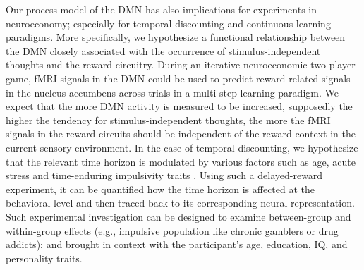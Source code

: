 \documentclass[10pt,letterpaper]{article}
\begin{document}
Our process model of the DMN has also implications for experiments in neuroeconomy; especially for temporal discounting and continuous learning paradigms. More specifically, we hypothesize a functional relationship between the DMN closely associated with the occurrence of stimulus-independent thoughts and the reward circuitry. During an iterative neuroeconomic two-player game, fMRI signals in the DMN could be used to predict reward-related signals in the nucleus accumbens across trials in a multi-step learning paradigm. We expect that the more DMN activity is measured to be increased, supposedly the higher the tendency for stimulus-independent thoughts, the more the fMRI signals in the reward circuits should be independent of the reward context in the current sensory environment. In the case of temporal discounting, we hypothesize that the relevant time horizon is modulated by various factors such as age, acute stress and time-enduring impulsivity traits
\citep{luksys2009stress, haushofer2014psychology}.
Using such a delayed-reward experiment, it can be quantified how the time horizon is affected at the behavioral level and then traced back to its corresponding neural representation. Such experimental investigation can be designed to examine between-group and within-group effects (e.g., impulsive population like chronic gamblers or drug addicts); and brought in context with the participant’s age, education, IQ, and personality traits.
\end{document}
